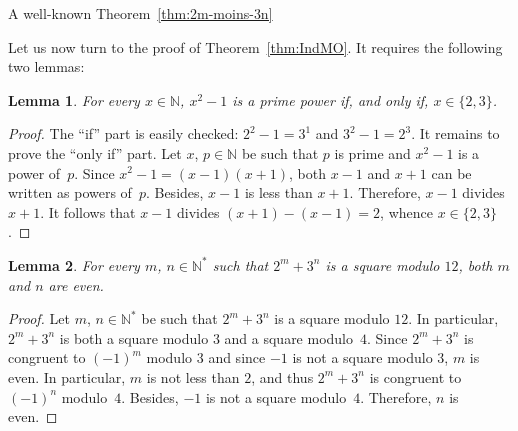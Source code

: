 \documentclass[12pt]{article}
\newcommand{\bZ}{\mathbb{Z}}
\newcommand{\bN}{\mathbb{N}} %
\newcommand{\bNast}{\bN^*}
\newtheorem{lemma}{Lemma}
\theoremstyle{definition}
\begin{document}
   A well-known Theorem~\ref{thm:2m-moins-3n} 
   
   Let us now turn to the proof of Theorem~\ref{thm:IndMO}.
   It requires the following two lemmas:

     \begin{lemma} \label{lem:x2=q+1}
       For every $x \in \bN$, $x^2 - 1$ is a prime power if, and only if, $x \in \{ 2, 3 \}$. 
     \end{lemma}

     \begin{proof}
       The ``if'' part is easily checked: $2^2 - 1 = 3^1$ and $3^2 - 1 = 2^3$. 
       It remains to prove the ``only if'' part.
       Let $x$, $p \in \bN$ be such that $p$ is prime and $x^2 - 1$ is a power of~$p$.
       Since  $x^2 - 1 = (x - 1)(x + 1)$, 
       both $x - 1$ and $x + 1$ can be written as powers of~$p$.
       Besides, $x - 1$ is less than $x + 1$.
       Therefore, $x - 1$ divides $x + 1$.
       It follows that $x - 1$ divides $(x + 1) - (x - 1) = 2$,
       whence $x \in \{ 2, 3 \}$.
    \end{proof} 
    

   
   \begin{lemma} \label{lem:2m+3n-square-mod-12}
     For every $m$, $n \in \bNast$ such that $2^m + 3^n$ is a square modulo $12$,
     both $m$ and $n$ are even.
   \end{lemma}

   \begin{proof}
     Let $m$, $n \in \bNast$ be such that $2^m + 3^n$ is a square modulo $12$.
     In particular, $2^m + 3^n$ is both a square modulo $3$ and a square modulo~$4$.
     Since $2^m + 3^n$ is congruent to ${(- 1)}^m$ modulo $3$ and since $- 1$ is not a square modulo $3$,
     $m$ is even.
     In particular, $m$ is not less than $2$, and thus $2^m + 3^n$ is congruent to ${(- 1)}^n$ modulo~$4$.
     Besides, $- 1$ is not a square modulo~$4$.
     Therefore, $n$ is even.
   \end{proof}
\end{document}

